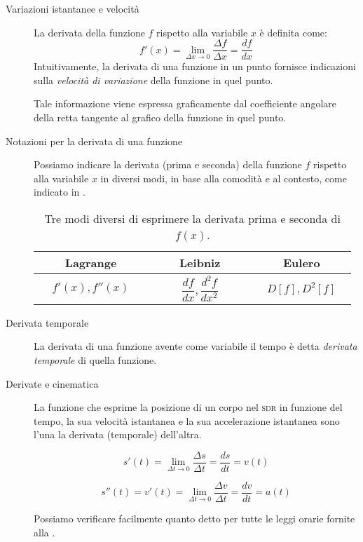 \documentclass[a4paper,11pt,italian]{article}
\begin{document}
\begin{description}
  \item[Variazioni istantanee e velocità]
  La derivata della funzione $ f $ rispetto alla variabile $ x $ è definita come:
  \[ f'(x) = \lim_{\Delta x \to 0} \frac{\Delta f}{\Delta x} = \frac{df}{dx} \]
  Intuitivamente, la derivata di una funzione in un punto fornisce indicazioni sulla \emph{velocità di variazione} della funzione in quel punto.
  
  Tale informazione viene espressa graficamente dal coefficiente angolare della retta tangente al grafico della funzione in quel punto.
  
  \item[Notazioni per la derivata di una funzione]
  Possiamo indicare la derivata (prima e seconda) della funzione $ f $ rispetto alla variabile $ x $ in diversi modi, in base alla comodità e al contesto, come indicato in .
  
  \begin{table}[htp]\centering
  \begin{tabular}{ccc}\toprule
    ~~~~\textbf{Lagrange}~~~~ & ~~~~\textbf{Leibniz}~~~~ & ~~~~\textbf{Eulero}~~~~ \\\midrule
    $ f'(x),f''(x) $ & $ \dfrac{df}{dx},\dfrac{d^2 f}{dx^2} $ & $ D[f], D^2[f] $ \\\bottomrule
  \end{tabular}
  \caption{Tre modi diversi di esprimere la derivata prima e seconda di $ f(x) $.}
  \label{tab:scritturaderivate}
  \end{table}
  
  \item[Derivata temporale]
  La derivata di una funzione avente come variabile il tempo è detta \emph{derivata temporale} di quella funzione.
  
  \item[Derivate e cinematica]
  La funzione che esprime la posizione di un corpo nel \textsc{sdr} in funzione del tempo, la sua velocità istantanea e la sua accelerazione istantanea sono l'una la derivata (temporale) dell'altra.
  
  \[ s'(t) = \displaystyle \lim_{\Delta t \to 0} \frac{\Delta s}{\Delta t} = \frac{ds}{dt} = v(t) \]
  
  \[ s''(t) = v'(t) = \displaystyle \lim_{\Delta t \to 0} \frac{\Delta v}{\Delta t} = \frac{dv}{dt} = a(t) \]
  
  Possiamo verificare facilmente quanto detto per tutte le leggi orarie fornite alla .
  

\end{description}
\end{document}
